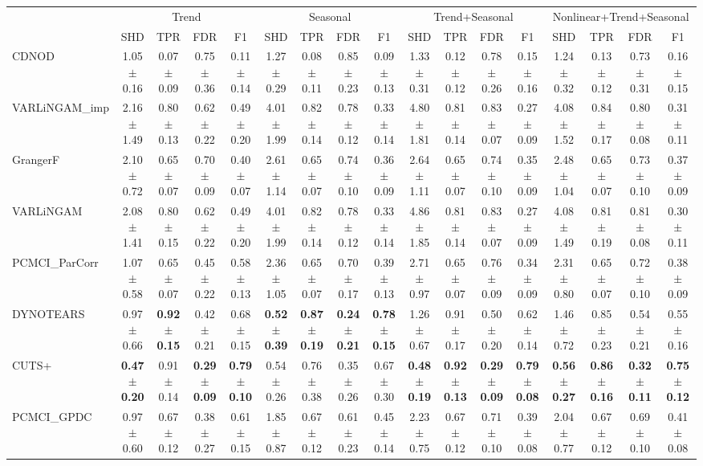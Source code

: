 \begin{tabular}{lcccccccccccccccc}
\toprule
 & \multicolumn{4}{c}{Trend} & \multicolumn{4}{c}{Seasonal} & \multicolumn{4}{c}{Trend+Seasonal} & \multicolumn{4}{c}{Nonlinear+Trend+Seasonal} \\
 & SHD & TPR & FDR & F1 & SHD & TPR & FDR & F1 & SHD & TPR & FDR & F1 & SHD & TPR & FDR & F1 \\
\midrule
CDNOD & 1.05 $\pm$ 0.16 & 0.07 $\pm$ 0.09 & 0.75 $\pm$ 0.36 & 0.11 $\pm$ 0.14 & 1.27 $\pm$ 0.29 & 0.08 $\pm$ 0.11 & 0.85 $\pm$ 0.23 & 0.09 $\pm$ 0.13 & 1.33 $\pm$ 0.31 & 0.12 $\pm$ 0.12 & 0.78 $\pm$ 0.26 & 0.15 $\pm$ 0.16 & 1.24 $\pm$ 0.32 & 0.13 $\pm$ 0.12 & 0.73 $\pm$ 0.31 & 0.16 $\pm$ 0.15 \\
VARLiNGAM\_imp & 2.16 $\pm$ 1.49 & 0.80 $\pm$ 0.13 & 0.62 $\pm$ 0.22 & 0.49 $\pm$ 0.20 & 4.01 $\pm$ 1.99 & 0.82 $\pm$ 0.14 & 0.78 $\pm$ 0.12 & 0.33 $\pm$ 0.14 & 4.80 $\pm$ 1.81 & 0.81 $\pm$ 0.14 & 0.83 $\pm$ 0.07 & 0.27 $\pm$ 0.09 & 4.08 $\pm$ 1.52 & 0.84 $\pm$ 0.17 & 0.80 $\pm$ 0.08 & 0.31 $\pm$ 0.11 \\
GrangerF & 2.10 $\pm$ 0.72 & 0.65 $\pm$ 0.07 & 0.70 $\pm$ 0.09 & 0.40 $\pm$ 0.07 & 2.61 $\pm$ 1.14 & 0.65 $\pm$ 0.07 & 0.74 $\pm$ 0.10 & 0.36 $\pm$ 0.09 & 2.64 $\pm$ 1.11 & 0.65 $\pm$ 0.07 & 0.74 $\pm$ 0.10 & 0.35 $\pm$ 0.09 & 2.48 $\pm$ 1.04 & 0.65 $\pm$ 0.07 & 0.73 $\pm$ 0.10 & 0.37 $\pm$ 0.09 \\
VARLiNGAM & 2.08 $\pm$ 1.41 & 0.80 $\pm$ 0.15 & 0.62 $\pm$ 0.22 & 0.49 $\pm$ 0.20 & 4.01 $\pm$ 1.99 & 0.82 $\pm$ 0.14 & 0.78 $\pm$ 0.12 & 0.33 $\pm$ 0.14 & 4.86 $\pm$ 1.85 & 0.81 $\pm$ 0.14 & 0.83 $\pm$ 0.07 & 0.27 $\pm$ 0.09 & 4.08 $\pm$ 1.49 & 0.81 $\pm$ 0.19 & 0.81 $\pm$ 0.08 & 0.30 $\pm$ 0.11 \\
PCMCI\_ParCorr & 1.07 $\pm$ 0.58 & 0.65 $\pm$ 0.07 & 0.45 $\pm$ 0.22 & 0.58 $\pm$ 0.13 & 2.36 $\pm$ 1.05 & 0.65 $\pm$ 0.07 & 0.70 $\pm$ 0.17 & 0.39 $\pm$ 0.13 & 2.71 $\pm$ 0.97 & 0.65 $\pm$ 0.07 & 0.76 $\pm$ 0.09 & 0.34 $\pm$ 0.09 & 2.31 $\pm$ 0.80 & 0.65 $\pm$ 0.07 & 0.72 $\pm$ 0.10 & 0.38 $\pm$ 0.09 \\
DYNOTEARS & 0.97 $\pm$ 0.66 & \textbf{0.92 $\pm$ 0.15} & 0.42 $\pm$ 0.21 & 0.68 $\pm$ 0.15 & \textbf{0.52 $\pm$ 0.39} & \textbf{0.87 $\pm$ 0.19} & \textbf{0.24 $\pm$ 0.21} & \textbf{0.78 $\pm$ 0.15} & 1.26 $\pm$ 0.67 & 0.91 $\pm$ 0.17 & 0.50 $\pm$ 0.20 & 0.62 $\pm$ 0.14 & 1.46 $\pm$ 0.72 & 0.85 $\pm$ 0.23 & 0.54 $\pm$ 0.21 & 0.55 $\pm$ 0.16 \\
CUTS+ & \textbf{0.47 $\pm$ 0.20} & 0.91 $\pm$ 0.14 & \textbf{0.29 $\pm$ 0.09} & \textbf{0.79 $\pm$ 0.10} & 0.54 $\pm$ 0.26 & 0.76 $\pm$ 0.38 & 0.35 $\pm$ 0.26 & 0.67 $\pm$ 0.30 & \textbf{0.48 $\pm$ 0.19} & \textbf{0.92 $\pm$ 0.13} & \textbf{0.29 $\pm$ 0.09} & \textbf{0.79 $\pm$ 0.08} & \textbf{0.56 $\pm$ 0.27} & \textbf{0.86 $\pm$ 0.16} & \textbf{0.32 $\pm$ 0.11} & \textbf{0.75 $\pm$ 0.12} \\
PCMCI\_GPDC & 0.97 $\pm$ 0.60 & 0.67 $\pm$ 0.12 & 0.38 $\pm$ 0.27 & 0.61 $\pm$ 0.15 & 1.85 $\pm$ 0.87 & 0.67 $\pm$ 0.12 & 0.61 $\pm$ 0.23 & 0.45 $\pm$ 0.14 & 2.23 $\pm$ 0.75 & 0.67 $\pm$ 0.12 & 0.71 $\pm$ 0.10 & 0.39 $\pm$ 0.08 & 2.04 $\pm$ 0.77 & 0.67 $\pm$ 0.12 & 0.69 $\pm$ 0.10 & 0.41 $\pm$ 0.08 \\
\bottomrule
\end{tabular}
